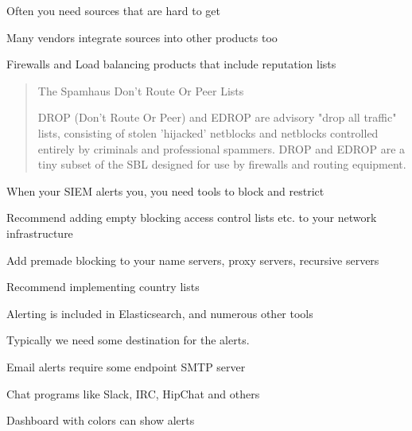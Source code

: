 \documentclass[Screen16to9,17pt]{foils}
\begin{document}
\begin{list2}
\item Often you need sources that are hard to get
\item Many vendors integrate sources into other products too
\item Firewalls and Load balancing products that include reputation lists
\end{list2}


\begin{quote}
The Spamhaus Don't Route Or Peer Lists

DROP (Don't Route Or Peer) and EDROP are advisory "drop all traffic" lists, consisting of stolen 'hijacked' netblocks and netblocks controlled entirely by criminals and professional spammers. DROP and EDROP are a tiny subset of the SBL designed for use by firewalls and routing equipment.
\end{quote}



\begin{list2}
\item When your SIEM alerts you, you need tools to block and restrict
\item Recommend adding empty blocking access control lists etc. to your network infrastructure
\item Add premade blocking to your name servers, proxy servers, recursive servers
\item Recommend implementing country lists
\end{list2}













\begin{list2}
\item Alerting is included in Elasticsearch, and numerous other tools
\item Typically we need some destination for the alerts.
\item Email alerts require some endpoint SMTP server
\item Chat programs like Slack, IRC, HipChat and others
\item Dashboard with colors can show alerts
\end{list2}




\slidenext{}
\end{document}
